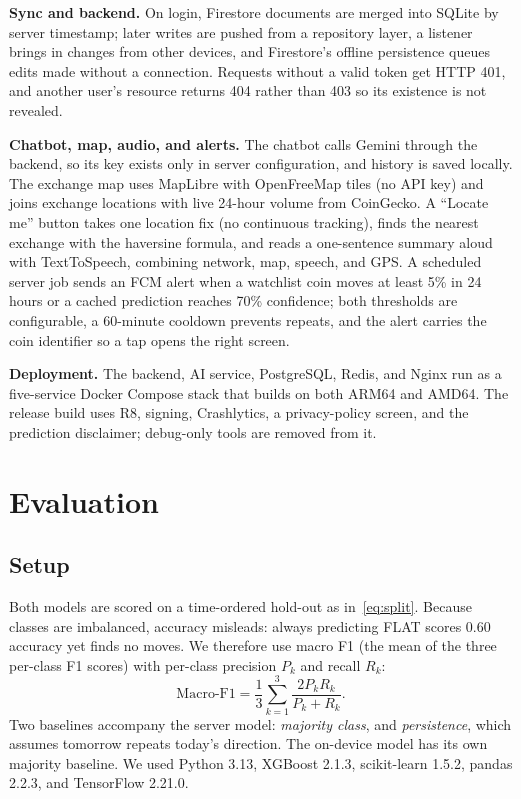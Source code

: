 \documentclass[conference]{IEEEtran}
\begin{document}
\textbf{Sync and backend.} On login, Firestore documents are merged into SQLite by server timestamp; later writes are pushed from a repository layer, a listener brings in changes from other devices, and Firestore's offline persistence queues edits made without a connection. Requests without a valid token get HTTP 401, and another user's resource returns 404 rather than 403 so its existence is not revealed.

\textbf{Chatbot, map, audio, and alerts.} The chatbot calls Gemini through the backend, so its key exists only in server configuration, and history is saved locally. The exchange map uses MapLibre with OpenFreeMap tiles (no API key) and joins exchange locations with live 24-hour volume from CoinGecko. A ``Locate me'' button takes one location fix (no continuous tracking), finds the nearest exchange with the haversine formula, and reads a one-sentence summary aloud with TextToSpeech, combining network, map, speech, and GPS. A scheduled server job sends an FCM alert when a watchlist coin moves at least 5\% in 24 hours or a cached prediction reaches 70\% confidence; both thresholds are configurable, a 60-minute cooldown prevents repeats, and the alert carries the coin identifier so a tap opens the right screen.

\textbf{Deployment.} The backend, AI service, PostgreSQL, Redis, and Nginx run as a five-service Docker Compose stack that builds on both ARM64 and AMD64. The release build uses R8, signing, Crashlytics, a privacy-policy screen, and the prediction disclaimer; debug-only tools are removed from it.

\section{Evaluation}

\subsection{Setup}
Both models are scored on a time-ordered hold-out as in~\eqref{eq:split}. Because classes are imbalanced, accuracy misleads: always predicting FLAT scores 0.60 accuracy yet finds no moves. We therefore use macro F1 (the mean of the three per-class F1 scores) with per-class precision $P_k$ and recall $R_k$:
\begin{equation}
\mathrm{Macro\text{-}F1}=\frac{1}{3}\sum_{k=1}^{3}\frac{2P_kR_k}{P_k+R_k}.
\end{equation}
Two baselines accompany the server model: \emph{majority class}, and \emph{persistence}, which assumes tomorrow repeats today's direction. The on-device model has its own majority baseline. We used Python 3.13, XGBoost 2.1.3, scikit-learn 1.5.2, pandas 2.2.3, and TensorFlow 2.21.0.
\end{document}
